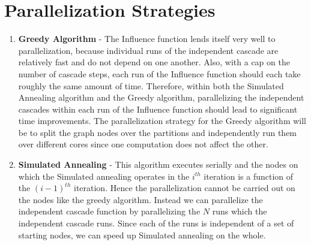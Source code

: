 \documentclass[11pt]{scrartcl} %
\begin{document}
\section{Parallelization Strategies}
\begin{enumerate}
\item \textbf{Greedy Algorithm} - The Influence function lends itself very well to parallelization, because individual runs of the independent cascade are relatively fast and do not depend on one another.  Also, with a cap on the number of cascade steps, each run of the Influence function should each take roughly the same amount of time.  Therefore, within both the Simulated Annealing algorithm and the Greedy algorithm, parallelizing the independent cascades within each run of the Influence function should lead to significant time improvements. The parallelization strategy for the Greedy algorithm will be to split the graph nodes over the partitions and independently run them over different cores since one computation does not affect the other.

\item \textbf{Simulated Annealing} - This algorithm executes serially and the nodes on which the Simulated annealing operates in the $i^{th}$ iteration is a function of the $(i-1)^{th}$ iteration. Hence the parallelization cannot be carried out on the nodes like the greedy algorithm. Instead we can parallelize the independent cascade function by parallelizing the $N$ runs which the independent cascade runs. Since each of the runs is independent of a set of starting nodes, we can speed up Simulated annealing on the whole.
\end{enumerate}
\end{document}
